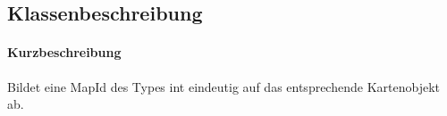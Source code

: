\subsection*{Klassenbeschreibung}%
\paragraph*{Kurzbeschreibung}
    Bildet eine MapId des Types int eindeutig auf das entsprechende Kartenobjekt ab.
